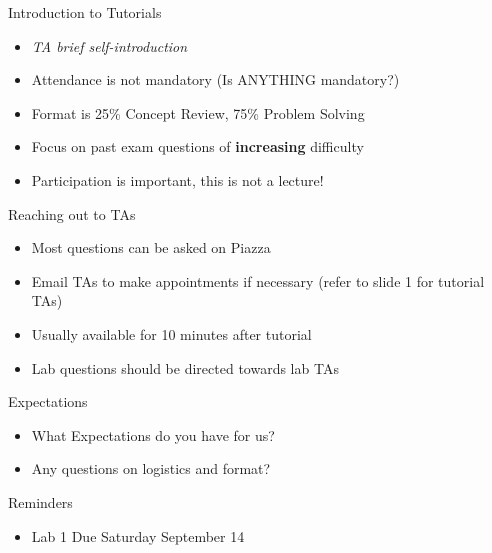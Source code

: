

\begin{frame}{Introduction to Tutorials}
    \begin{itemize}
        \item \textit{TA brief self-introduction}
        \item Attendance is not mandatory (Is ANYTHING mandatory?)
        \item Format is 25\% Concept Review, 75\% Problem Solving
        \item Focus on past exam questions of \textbf{increasing} difficulty
        \item Participation is important, this is not a lecture!
    \end{itemize}
\end{frame}

\begin{frame}{Reaching out to TAs}
    \begin{itemize}
        \item Most questions can be asked on Piazza
        \item Email TAs to make appointments if necessary (refer to slide 1 for tutorial TAs)
        \item Usually available for 10 minutes after tutorial
        \item Lab questions should be directed towards lab TAs
        
    \end{itemize}
\end{frame}
\begin{frame}{Expectations}
    \begin{itemize}
        \item What Expectations do you have for us?
        \item Any questions on logistics and format?
    \end{itemize}
\end{frame}

\begin{frame}{Reminders}
    \begin{itemize}
        \item Lab 1 Due Saturday September 14
    \end{itemize}
\end{frame}



